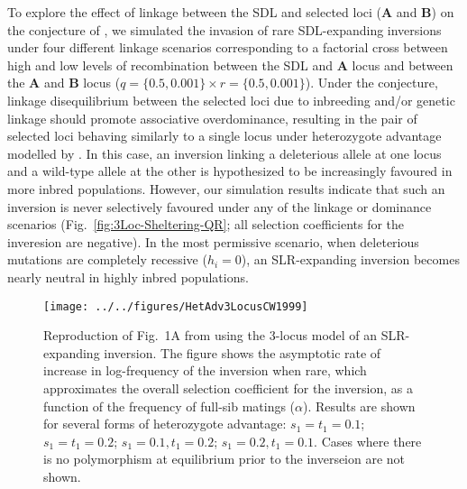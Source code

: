 \documentclass{article}
\def\mbf#1{\mathbf{#1}}
\begin{document}
\begin{appendices}
To explore the effect of linkage between the SDL and selected loci ($\mbf{A}$ and $\mbf{B}$) on the conjecture of \citet{CharlesworthWall1999}, we simulated the invasion of rare SDL-expanding inversions under four different linkage scenarios corresponding to a factorial cross between high and low levels of recombination between the SDL and $\mbf{A}$ locus and between the $\mbf{A}$ and $\mbf{B}$ locus ($q = \{0.5, 0.001\} \times r = \{0.5, 0.001\}$). Under the conjecture, linkage disequilibrium between the selected loci due to inbreeding and/or genetic linkage should promote associative overdominance, resulting in the pair of selected loci behaving similarly to a single locus under heterozygote advantage modelled by \citep{CharlesworthWall1999}. In this case, an inversion linking a deleterious allele at one locus and a wild-type allele at the other is hypothesized to be increasingly favoured in more inbred populations. However, our simulation results indicate that such an inversion is never selectively favoured under any of the linkage or dominance scenarios (Fig.~\ref{fig:3Loc-Sheltering-QR}; all selection coefficients for the inveresion are negative). In the most permissive scenario, when deleterious mutations are completely recessive ($h_i = 0$), an SLR-expanding inversion becomes nearly neutral in highly inbred populations.

 \begin{figure}[htbp]
 \centering
 \texttt{[image: ../../figures/HetAdv3LocusCW1999]}
 \caption{Reproduction of Fig.~1A from \citet{CharlesworthWall1999} using the 3-locus model of an SLR-expanding inversion. The figure shows the asymptotic rate of increase in log-frequency of the inversion when rare, which approximates the overall selection coefficient for the inversion, as a function of the frequency of full-sib matings ($\alpha$). Results are shown for several forms of heterozygote advantage: $s_1 = t_1 = 0.1$;  $s_1 = t_1 = 0.2$;  $s_1 = 0.1, t_1 = 0.2$;  $s_1 = 0.2, t_1 = 0.1$. Cases where there is no polymorphism at equilibrium prior to the inverseion are not shown.}
 \label{fig:3Loc-CW1999}
 \end{figure}



\end{appendices}
\end{document}
